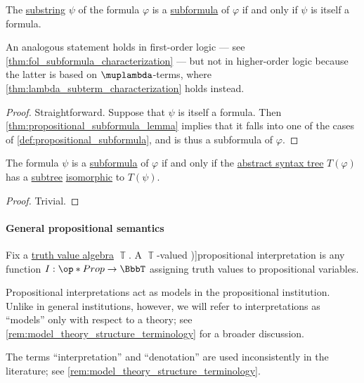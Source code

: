 \begin{proposition}\label{thm:propositional_subformula_characterization}
  The \hyperref[def:formal_language/substring]{substring} \( \psi \) of the formula \( \varphi \) is a \hyperref[def:propositional_subformula]{subformula} of \( \varphi \) if and only if \( \psi \) is itself a formula.
\end{proposition}
\begin{comments}
  \item An analogous statement holds in first-order logic --- see \cref{thm:fol_subformula_characterization} --- but not in higher-order logic because the latter is based on \( \muplambda \)-terms, where \cref{thm:lambda_subterm_characterization} holds instead.
\end{comments}
\begin{proof}
  \SufficiencySubProof Straightforward.
  \NecessitySubProof Suppose that \( \psi \) is itself a formula. Then \cref{thm:propositional_subformula_lemma} implies that it falls into one of the cases of \cref{def:propositional_subformula}, and is thus a subformula of \( \varphi \).
\end{proof}

\begin{proposition}\label{thm:propositional_ast_subformula}
  The formula \( \psi \) is a \hyperref[def:propositional_subformula]{subformula} of \( \varphi \) if and only if the \hyperref[def:propositional_formula_ast]{abstract syntax tree} \( T(\varphi) \) has a \hyperref[def:tree/subobject]{subtree} \hyperref[def:labeled_tree/morphism]{isomorphic} to \( T(\psi) \).
\end{proposition}
\begin{proof}
  Trivial.
\end{proof}

\paragraph{General propositional semantics}

\begin{definition}\label{def:propositional_interpretation}\mimprovised
  Fix a \hyperref[def:truth_value_algebra]{truth value algebra} \( \BbbT \). A \( \BbbT \)-valued \term[ru=интерпретация (\cite[def. 1.1.10]{Герасимов2014Вычислимость})]{propositional interpretation} is any function \( I: \op*{Prop} \to \BbbT \) assigning truth values to propositional variables.
\end{definition}
\begin{comments}
  \item Propositional interpretations act as models in the propositional institution. Unlike in general institutions, however, we will refer to interpretations as \enquote{models} only with respect to a theory; see \cref{rem:model_theory_structure_terminology} for a broader discussion.

  \item The terms \enquote{interpretation} and \enquote{denotation} are used inconsistently in the literature; see \cref{rem:model_theory_structure_terminology}.
\end{comments}

